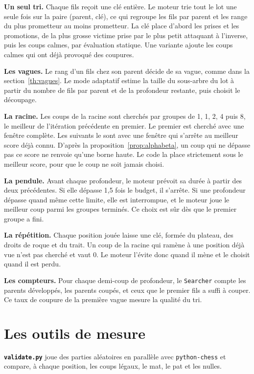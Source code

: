 \documentclass[11pt,a4paper]{article}
\newcommand{\code}[1]{\texttt{#1}}
\theoremstyle{plain}
\begin{document}
\textbf{Un seul tri.} Chaque fils reçoit une clé entière. Le moteur trie tout le lot une seule
fois sur la paire (parent, clé), ce qui regroupe les fils par parent et les range du plus
prometteur au moins prometteur. La clé place d'abord les prises et les promotions, de la plus
grosse victime prise par le plus petit attaquant à l'inverse, puis les coups calmes, par
évaluation statique. Une variante ajoute les coups calmes qui ont déjà provoqué des coupures.

\textbf{Les vagues.} Le rang d'un fils chez son parent décide de sa vague, comme dans la
section~\ref{th:vagues}. Le mode adaptatif estime la taille du sous-arbre du lot à partir du
nombre de fils par parent et de la profondeur restante, puis choisit le découpage.

\textbf{La racine.} Les coups de la racine sont cherchés par groupes de 1, 1, 2, 4 puis 8, le
meilleur de l'itération précédente en premier. Le premier est cherché avec une fenêtre complète.
Les suivants le sont avec une fenêtre qui s'arrête au meilleur score déjà connu. D'après la
proposition~\ref{prop:alphabeta}, un coup qui ne dépasse pas ce score ne renvoie qu'une borne
haute. Le code la place strictement sous le meilleur score, pour que le coup ne soit jamais
choisi.

\textbf{La pendule.} Avant chaque profondeur, le moteur prévoit sa durée à partir des deux
précédentes. Si elle dépasse 1,5 fois le budget, il s'arrête. Si une profondeur dépasse quand
même cette limite, elle est interrompue, et le moteur joue le meilleur coup parmi les groupes
terminés. Ce choix est sûr dès que le premier groupe a fini.

\textbf{La répétition.} Chaque position jouée laisse une clé, formée du plateau, des droits de
roque et du trait. Un coup de la racine qui ramène à une position déjà vue n'est pas cherché et
vaut 0. Le moteur l'évite donc quand il mène et le choisit quand il est perdu.

\textbf{Les compteurs.} Pour chaque demi-coup de profondeur, le \code{Searcher} compte les
parents développés, les parents coupés, et ceux que le premier fils a suffi à couper. Ce taux de
coupure de la première vague mesure la qualité du tri.

\section{Les outils de mesure}

\textbf{\code{validate.py}} joue des parties aléatoires en parallèle avec \code{python-chess} et
compare, à chaque position, les coups légaux, le mat, le pat et les nulles.
\end{document}
